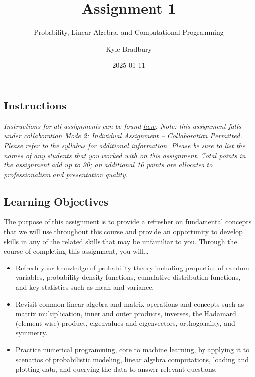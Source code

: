 \documentclass[
  letterpaper,
  DIV=11,
  numbers=noendperiod]{scrartcl}
\title{Assignment 1}
\subtitle{Probability, Linear Algebra, and Computational Programming}
\author{Kyle Bradbury}
\date{2025-01-11}
\providecommand{\tightlist}{%
  \setlength{\itemsep}{0pt}\setlength{\parskip}{0pt}}\usepackage{longtable,booktabs,array}
\renewcommand*\contentsname{Table of contents}
\newcommand\contentsname{Table of contents}
\begin{document}
\maketitle

\renewcommand*\contentsname{Table of contents}
{
\hypersetup{linkcolor=}
\setcounter{tocdepth}{1}
\tableofcontents
}

\subsection{Instructions}\label{instructions}

\emph{Instructions for all assignments can be found
\href{https://kylebradbury.github.io/ids705/notebooks/assignment_instructions.html}{here}.
Note: this assignment falls under collaboration Mode 2: Individual
Assignment -- Collaboration Permitted. Please refer to the syllabus for
additional information. Please be sure to list the names of any students
that you worked with on this assignment. Total points in the assignment
add up to 90; an additional 10 points are allocated to professionalism
and presentation quality.}

\subsection{Learning Objectives}\label{learning-objectives}

The purpose of this assignment is to provide a refresher on fundamental
concepts that we will use throughout this course and provide an
opportunity to develop skills in any of the related skills that may be
unfamiliar to you. Through the course of completing this assignment, you
will\ldots{}

\begin{itemize}
\tightlist
\item
  Refresh your knowledge of probability theory including properties of
  random variables, probability density functions, cumulative
  distribution functions, and key statistics such as mean and variance.
\item
  Revisit common linear algebra and matrix operations and concepts such
  as matrix multiplication, inner and outer products, inverses, the
  Hadamard (element-wise) product, eigenvalues and eigenvectors,
  orthogonality, and symmetry.
\item
  Practice numerical programming, core to machine learning, by applying
  it to scenarios of probabilistic modeling, linear algebra
  computations, loading and plotting data, and querying the data to
  answer relevant questions.
\end{itemize}
\end{document}
